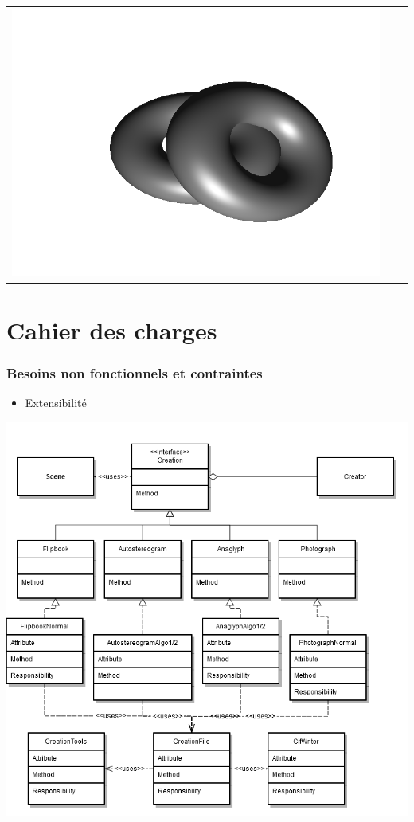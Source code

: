 \documentclass{beamer}
\begin{document}
\begin{frame}
\begin{tabular}{l|c|r}
\includegraphics[scale=0.15]{flip3.png}
\end{tabular}
\end{frame}

%
\section{Cahier des charges}

\begin{frame}
\frametitle{Besoins non fonctionnels et contraintes}
\begin{itemize}[label=$\bullet$]
\item Extensibilité
\end{itemize}
\centering
\includegraphics[scale=0.25]{extensibilite.png}
\end{frame}
\end{document}
